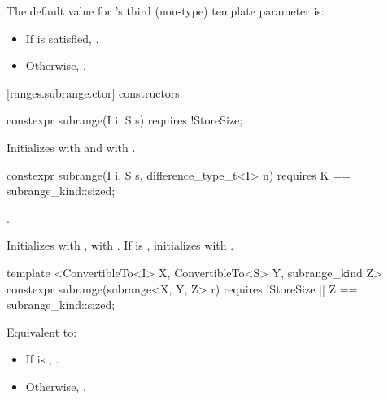 \pnum
The default value for 's third (non-type) template parameter is:
\begin{itemize}
\item If  is satisfied, .
\item Otherwise, .
\end{itemize}

[ranges.subrange.ctor]{ constructors}

%
\begin{itemdecl}
constexpr subrange(I i, S s) requires !StoreSize;
\end{itemdecl}

\begin{itemdescr}
\pnum
\effects Initializes  with  and  with
.
\end{itemdescr}

%
\begin{itemdecl}
constexpr subrange(I i, S s, difference_type_t<I> n)
  requires K == subrange_kind::sized;
\end{itemdecl}

\begin{itemdescr}
\pnum
\requires {}.

\pnum
\effects Initializes  with ,  with
. If  is , initializes  with
.
\end{itemdescr}

%
\begin{itemdecl}
template <ConvertibleTo<I> X, ConvertibleTo<S> Y, subrange_kind Z>
constexpr subrange(subrange<X, Y, Z> r)
  requires !StoreSize || Z == subrange_kind::sized;
\end{itemdecl}

\begin{itemdescr}
\pnum
\effects Equivalent to:
\begin{itemize}
\item If  is ,
.
\item Otherwise, .
\end{itemize}
\end{itemdescr}

